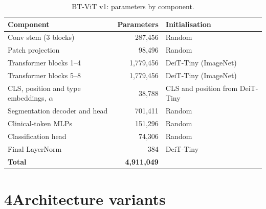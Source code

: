 \documentclass[10pt]{article}
\begin{document}
\begin{table}[h]
\centering
\begin{threeparttable}
\caption{BT-ViT v1: parameters by component.}
\label{tab:params}
\small
\begin{tabular}{@{}lrl@{}}
\toprule
Component & Parameters & Initialisation \\
\midrule
Conv stem (3 blocks)                         & 287{,}456   & Random \\
Patch projection                             & 98{,}496    & Random \\
Transformer blocks 1--4                      & 1{,}779{,}456 & DeiT-Tiny (ImageNet) \\
Transformer blocks 5--8                      & 1{,}779{,}456 & DeiT-Tiny (ImageNet) \\
CLS, position and type embeddings, $\alpha$  & 38{,}788    & CLS and position from DeiT-Tiny \\
Segmentation decoder and head                & 701{,}411   & Random \\
Clinical-token MLPs                          & 151{,}296   & Random \\
Classification head                          & 74{,}306    & Random \\
Final LayerNorm                              & 384         & DeiT-Tiny \\
\midrule
\textbf{Total}                               & \textbf{4{,}911{,}049} & \\
\bottomrule
\end{tabular}
\end{threeparttable}
\end{table}

\clearpage
\section*{4\quad Architecture variants}
\end{document}

